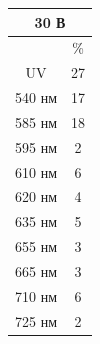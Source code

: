 \documentclass[a4paper,14pt]{extreport}
\begin{document}
	\begin{center}
		\begin{tabular}{|c|c|}
		\hline
		\multicolumn{2}{|c|}{30 В}                              \\ \hline
		                             & \%                       \\ \hline
		UV                       & 27                   \\ \hline
		540 нм                       & 17                      \\ \hline
		585 нм                       & 18                    \\ \hline
		595 нм                       & 2                      \\ \hline
		610 нм                       & 6                    \\ \hline
		620 нм                       & 4                      \\ \hline
		635 нм                       & 5                    \\ \hline
		655 нм                       & 3                    \\ \hline
		665 нм                       & 3                    \\ \hline
		710 нм                       & 6                    \\ \hline
		725 нм                       & 2                     \\ \hline
		\end{tabular}
	\end{center}
\end{document}
